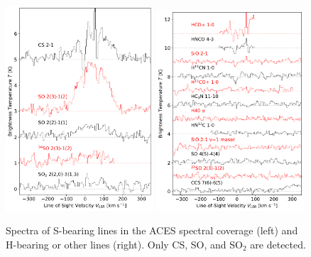 \documentclass[12pt,a4paper]{article}  %
\begin{document}
\begin{figure}
    \centering
    \includegraphics[width=0.49\textwidth]{figures/CSandSO_Overlays.pdf}
    \includegraphics[width=0.49\textwidth]{figures/NonDetection_Overlays.pdf}
    \caption{Spectra of S-bearing lines in the ACES spectral coverage (left) and H-bearing or other lines (right).
    Only CS, SO, and SO$_2$ are detected.
    }
    \label{fig:coarse_spectra}
\end{figure}
\end{document}
